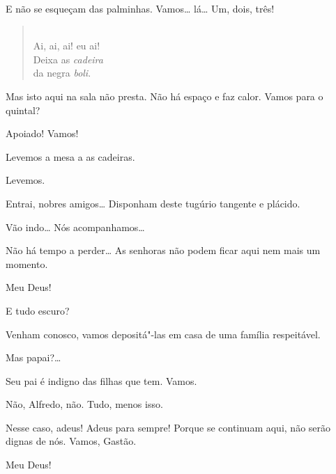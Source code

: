  E não se esqueçam das palminhas. Vamos\ldots{} 
lá\ldots{} Um, dois, três!  

\begin{verse}
 \\
Ai, ai, ai! eu ai!\\
Deixa as \textit{cadeira}\\
da negra \textit{boli}.
\end{verse}


 Mas isto aqui na sala não presta. Não há espaço e faz calor.
Vamos para o quintal?

 Apoiado! Vamos!

 Levemos a mesa a as cadeiras.

 Levemos. 

 Entrai, nobres amigos\ldots{} Disponham deste tugúrio tangente
e plácido.

 Vão indo\ldots{} Nós acompanhamos\ldots{} 

{}



 Não há tempo a perder\ldots{} As senhoras não podem ficar aqui nem
mais um momento.

 Meu Deus!

 E tudo escuro?

 Venham conosco, vamos depositá"-las em casa de uma família
respeitável.

 Mas papai?\ldots{}

 Seu pai é indigno das filhas que tem. Vamos.

 Não, Alfredo, não. Tudo, menos isso.

 Nesse caso, adeus! Adeus para sempre! Porque se continuam
aqui, não serão dignas de nós. Vamos, Gastão.

 Meu Deus!  

